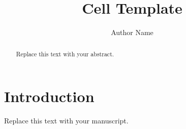 \documentclass[11pt]{article}
\title{Cell Template}
\author{Author Name}
\begin{document}
\maketitle
\begin{abstract}
Replace this text with your abstract.
\end{abstract}
\section{Introduction}
Replace this text with your manuscript.

% 
\end{document}
